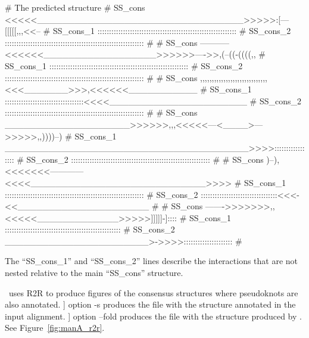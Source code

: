 \begin{sreoutput}
# The predicted structure
# SS_cons   <<<<<_________________________________>>>>>:[---[[[[[,,,<<--
# SS_cons_1 ::::::::::::::::::::::::::::::::::::::::::::::::::::::::::::
# SS_cons_2 ::::::::::::::::::::::::::::::::::::::::::::::::::::::::::::
#
# SS_cons   -----------<<<<<<__________________>>>>>>---->>,(--((-((((,,
# SS_cons_1 ::::::::::::::::::::::::::::::::::::::::::::::::::::::::::::
# SS_cons_2 ::::::::::::::::::::::::::::::::::::::::::::::::::::::::::::
#
# SS_cons   ,,,,,,,,,,,,,,,,,,,,,,,,,,,,,<<<_______>>>,<<<<<<___________
# SS_cons_1 ::::::::::::::::::::::::::::::::::<<<<______________________
# SS_cons_2 ::::::::::::::::::::::::::::::::::::::::::::::::::::::::::::
#
# SS_cons   ____________________>>>>>>,,,<<<<<---<____>--->>>>>,,))))--)
# SS_cons_1 _______________________________________>>>>:::::::::::::::::
# SS_cons_2 ::::::::::::::::::::::::::::::::::::::::::::::::::::::::::::
#
# SS_cons   )--),<<<<<<<------------<<<<____________________________>>>>
# SS_cons_1 ::::::::::::::::::::::::::::::::::::::::::::::::::::::::::::
# SS_cons_2 :::::::::::::::::::::::::::::::::<<<-<<_____________________
#
# SS_cons   ------->>>>>>>,,<<<<<_____________>>>>>]]]]]-]::::
# SS_cons_1 ::::::::::::::::::::::::::::::::::::::::::::::::::
# SS_cons_2 _______________________>->>>>:::::::::::::::::::::
#
\end{sreoutput}

\noindent
 The ``SS\_cons\_1'' and ``SS\_cons\_2'' lines describe the
 interactions that are not nested relative to the main ``SS\_cons''
 structure.

\rscape\, uses R2R to produce figures of the consensus structures
where pseudoknots are also annotated.  \rscape] option -s produces the
  file  with the structure
  annotated in the input alignment. \rscape] option --fold produces the
    file  with the
    structure produced by \rscape. See Figure~\ref{fig:manA_r2r}.


